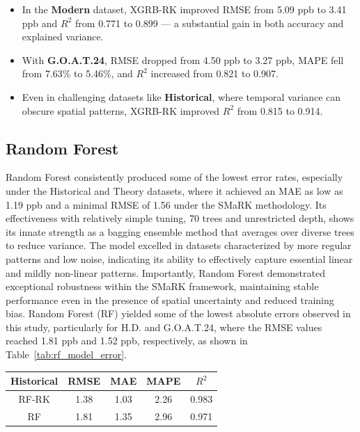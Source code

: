 \begin{itemize}
    \item In the \textbf{Modern} dataset, XGRB-RK improved RMSE from 5.09 ppb to 3.41 ppb and $R^{2}$ from 0.771 to 0.899 — a substantial gain in both accuracy and explained variance.
    \item With \textbf{G.O.A.T.24}, RMSE dropped from 4.50 ppb to 3.27 ppb, MAPE fell from 7.63\% to 5.46\%, and $R^{2}$ increased from 0.821 to 0.907.
    \item Even in challenging datasets like \textbf{Historical}, where temporal variance can obscure spatial patterns, XGRB-RK improved $R^{2}$ from 0.815 to 0.914.
\end{itemize}
\subsection{Random Forest} \label{rlts:rf} Random Forest consistently produced some of the lowest error rates, especially under the Historical and Theory datasets, where it achieved an MAE as low as 1.19 ppb and a minimal RMSE of 1.56 under the SMaRK methodology. Its effectiveness with relatively simple tuning, 70 trees and unrestricted depth, shows its innate strength as a bagging ensemble method that averages over diverse trees to reduce variance.  The model excelled in datasets characterized by more regular patterns and low noise, indicating its ability to effectively capture essential linear and mildly non-linear patterns. Importantly, Random Forest demonstrated exceptional robustness within the SMaRK framework, maintaining stable performance even in the presence of spatial uncertainty and reduced training bias. Random Forest (RF) yielded some of the lowest absolute errors observed in this study, particularly for H.D. and G.O.A.T.24, where the RMSE values reached 1.81 ppb and 1.52 ppb, respectively, as shown in Table~\ref{tab:rf_model_error}. \begin{table}[h!]
    \centering
        \begin{tabular}{||c|cccc||}
            \hline 
            \textbf{Historical} & \textbf{RMSE} & \textbf{MAE} & \textbf{MAPE} & \textbf{$R^{2}$} \\[3pt]
            \hline
            RF-RK & 1.38 & 1.03 &  2.26 & 0.983 \\[3pt]
               RF & 1.81 & 1.35 &  2.96 & 0.971 \\
            \hline 

\end{tabular}
\end{table}
